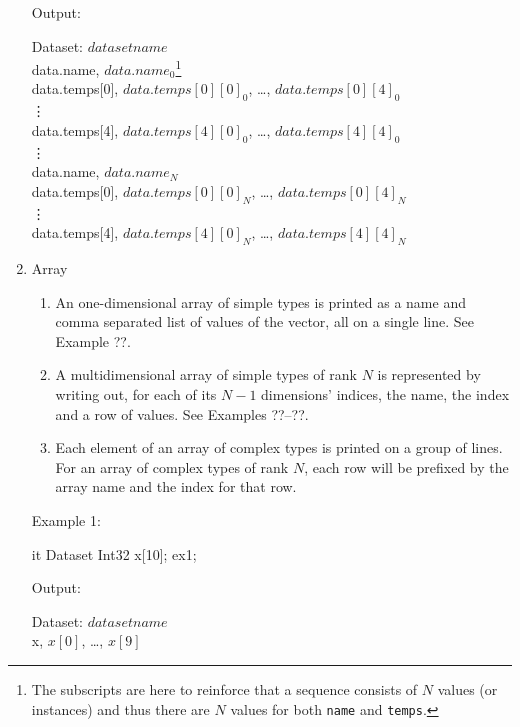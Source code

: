 \documentclass{article}
\begin{document}
\begin{enumerate}
\begin{minipage}{5in}
Output:\\
\begin{ttfamily}
Dataset: $dataset name$\\
data.name, $data.name_0$\footnote{The subscripts are here to reinforce that a
  sequence consists of $N$ values (or instances) and thus there are $N$
  values for both \texttt{name} and \texttt{temps}.}\\
data.temps[0], $data.temps[0][0]_0$, \ldots, $data.temps[0][4]_0$\\
\vdots\\
data.temps[4], $data.temps[4][0]_0$, \ldots, $data.temps[4][4]_0$\\
\vdots\\
data.name, $data.name_N$\\
data.temps[0], $data.temps[0][0]_N$, \ldots, $data.temps[0][4]_N$\\
\vdots\\
data.temps[4], $data.temps[4][0]_N$, \ldots, $data.temps[4][4]_N$\\
\end{ttfamily}
\T\end{minipage}
\T\bigskip

\item Array 
\begin{enumerate}
\item An one-dimensional array of simple types is printed as a name and comma
  separated list of values of the vector, all on a single line. See Example
  ??.
\item A multidimensional array of simple types of rank $N$ is represented by
  writing out, for each of its $N-1$ dimensions' indices, the name, the index
  and a row of values. See Examples ??--??.
\item Each element of an array of complex types is printed on a group of
  lines. For an array of complex types of rank $N$, each row will be prefixed
  by the array name and the index for that row. 
\end{enumerate}

\T\begin{minipage}{5in}
Example 1:
\T\medskip

\begin{vcode}{it}
Dataset {
    Int32 x[10];
} ex1;
\end{vcode}
\T\medskip

Output:\\
\begin{ttfamily}
Dataset: $dataset name$\\
x, $x[0]$, \ldots, $x[9]$
\end{ttfamily}
\T\end{minipage}
\T\bigskip


\end{enumerate}
\end{document}
